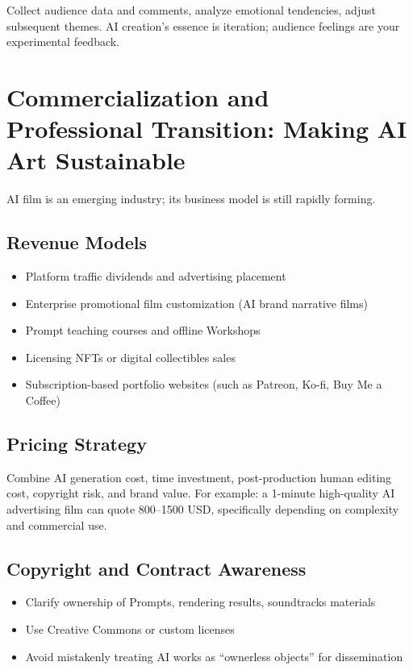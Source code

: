 Collect audience data and comments, analyze emotional tendencies, adjust subsequent themes. AI creation's essence is iteration; audience feelings are your experimental feedback.

\section{Commercialization and Professional Transition: Making AI Art Sustainable}
\label{sec:commercialization}

AI film is an emerging industry; its business model is still rapidly forming.

\subsection{Revenue Models}

\begin{itemize}
\item Platform traffic dividends and advertising placement
\item Enterprise promotional film customization (AI brand narrative films)
\item Prompt teaching courses and offline Workshops
\item Licensing NFTs or digital collectibles sales
\item Subscription-based portfolio websites (such as Patreon, Ko-fi, Buy Me a Coffee)
\end{itemize}

\subsection{Pricing Strategy}

Combine AI generation cost, time investment, post-production human editing cost, copyright risk, and brand value. For example: a 1-minute high-quality AI advertising film can quote 800--1500 USD, specifically depending on complexity and commercial use.

\subsection{Copyright and Contract Awareness}

\begin{itemize}
\item Clarify ownership of Prompts, rendering results, soundtracks materials
\item Use Creative Commons or custom licenses
\item Avoid mistakenly treating AI works as ``ownerless objects'' for dissemination
\end{itemize}

